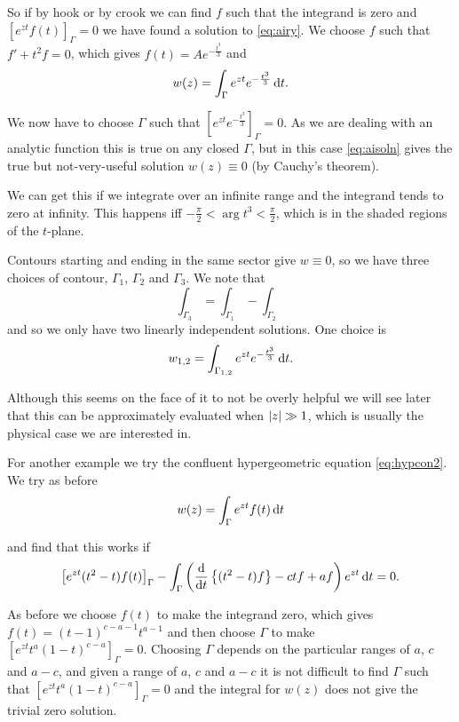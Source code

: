 \documentclass{notes}
\theoremstyle{plain}
\begin{document}
So if by hook or by crook we can find $f$ such that the integrand
is zero and $\left[e^{z t} f(t) \right]_\Gamma = 0$ we have found a
solution to \eqref{eq:airy}.  We choose $f$
such that $f' + t^2 f = 0$, which gives $f(t) = A e^{-\frac{t^3}{3}}$
and
\begin{equation}\label{eq:aisoln}
w(z) = \int_\Gamma e^{z t} e^{-\frac{t^3}{3}}\, \mathrm{d} t.
\end{equation}

We now have to choose $\Gamma$ such that $\left[e^{z t} e^{-\frac{t^3}{3}}
\right]_\Gamma = 0$.  As we are dealing with an analytic function
this is true on any closed $\Gamma$, but in this case \eqref{eq:aisoln}
gives the true but not-very-useful solution $w(z) \equiv 0$ (by Cauchy's
theorem).

We can get this if we integrate over an infinite range and the
integrand tends to zero at infinity.  This happens iff
$-\tfrac{\pi}{2} < \arg t^3 < \tfrac{\pi}{2}$, which is in
the shaded regions of the $t$-plane.
\vspace{1.5in}

Contours starting and ending in the same sector give $w \equiv 0$, so
we have three choices of contour, $\Gamma_1$, $\Gamma_2$ and $\Gamma_3$.
We note that
\[
\int_{\Gamma_3} = \int_{\Gamma_1} - \int_{\Gamma_2}
\]
and so we only have two linearly independent solutions.  One choice is
\[
w_{1,2} = \int_{\Gamma_{1,2}} e^{z t} e^{-\frac{t^3}{3}}\, \mathrm{d} t.
\]

Although this seems on the face of it to not be overly helpful we will see
later that this can be approximately evaluated when $\left|z\right| \gg 1$, which is
usually the physical case we are interested in.

For another example we try the confluent hypergeometric equation
\eqref{eq:hypcon2}.  We try as before
\[
w(z) = \int_\Gamma e^{z t} f(t)\, \mathrm{d} t
\]

and find that this works if
\[
\left[ e^{zt} (t^2-t) f(t) \right]_\Gamma -
\int_\Gamma \left(\frac{\mathrm{d}}{\mathrm{d} t}\left\{ (t^2 - t)f \right\}
- ctf + a f\right)e^{z t}\, \mathrm{d} t =0.
\]

As before we choose $f(t)$ to make the integrand zero,
which gives $f(t) = (t-1)^{c-a-1} t^{a-1}$ and then choose
$\Gamma$ to make $\left[ e^{z t} t^a (1-t)^{c-a} \right]_\Gamma = 0$.
Choosing $\Gamma$ depends on the particular ranges of $a$, $c$ and $a-c$,
and given a range of $a$, $c$ and $a-c$ it is not difficult to find
$\Gamma$ such that $\left[ e^{z t} t^a (1-t)^{c-a} \right]_\Gamma = 0$
and the integral for $w(z)$ does not give the trivial zero solution.
\end{document}
